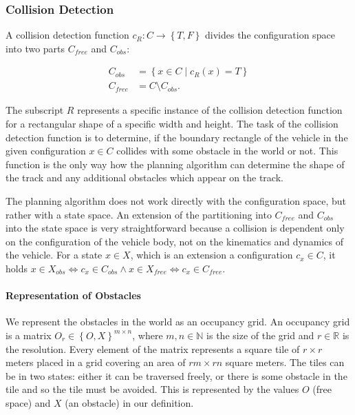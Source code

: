 \subsubsection{Collision Detection}

A collision detection function $c_{R}: C \rightarrow \left\{T, F\right\}$ divides the configuration space into two parts $C_{free}$ and $C_{obs}$:

\begin{equation*}
\begin{aligned}
	C_{obs} &= \left\{x\in C \mid c_{R}(x)=T\right\} \\
	C_{free} &= C \setminus C_{obs}.
\end{aligned}
\end{equation*}

The subscript $R$ represents a specific instance of the collision detection function for a rectangular shape of a specific width and height. The task of the collision detection function is to determine, if the boundary rectangle of the vehicle in the given configuration $x\in C$ collides with some obstacle in the world or not. This function is the only way how the planning algorithm can determine the shape of the track and any additional obstacles which appear on the track.

The planning algorithm does not work directly with the configuration space, but rather with a state space. An extension of the partitioning into $C_{free}$ and $C_{obs}$ into the state space is very straightforward because a collision is dependent only on the configuration of the vehicle body, not on the kinematics and dynamics of the vehicle. For a state $x\in X$, which is an extension a configuration $c_x \in C$, it holds $x\in X_{obs} \iff c_x\in C_{obs} \wedge x\in X_{free} \iff c_x\in C_{free}$.

\paragraph{Representation of Obstacles}
We represent the obstacles in the world as an occupancy grid. An occupancy grid is a matrix $O_r\in \left\{O, X\right\}^{m\times n}$, where $m,n\in\mathbb{N}$ is the size of the grid and $r\in\mathbb{R}$ is the resolution. Every element of the matrix represents a square tile of $r\times r$ meters placed in a grid covering an area of $rm\times rn$ square meters. The tiles can be in two states: either it can be traversed freely, or there is some obstacle in the tile and so the tile must be avoided. This is represented by the values $O$ (free space) and $X$ (an obstacle) in our definition.


